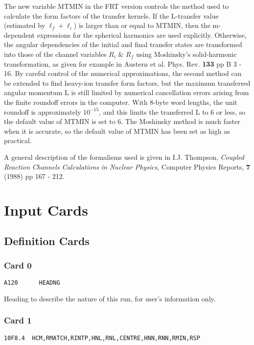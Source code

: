 \documentclass[11pt]{article}
\begin{document}
{The new variable MTMIN in the FRT version controls the method used to
calculate the form factors of the transfer kernels. If the L-transfer value
(estimated by $\ell_f + \ell_i$)
is larger than or equal to MTMIN, then the m-dependent expressions for the
spherical harmonics are used explicitly.
Otherwise, the
angular dependencies of the initial and final transfer states
are transformed into those of the channel variables $R_{i}$ \& $R_{f}$ using
Moshinsky's solid-harmonic transformation, as given for example
in
Austern et al. Phys. Rev. {\bf 133} pp B 3 - 16.
%
By careful control of the numerical approximations, the second method can
be extended to find heavy-ion transfer form factors, but the maximum
transferred angular momentum L is still limited by numerical cancellation
errors arising from the finite roundoff errors in the computer.
With 8-byte word lengths, the unit roundoff is approximately $10^{-15}$,
and this limits the transferred L to 6 or less, so the default value
of MTMIN is set to 6. The Moshinsky method is much faster when it is
accurate, so the default value of MTMIN has been set as high as practical.

A general description of the formalisms used is given in
I.J. Thompson,
{\em Coupled Reaction Channels Calculations in Nuclear Physics},
Computer Physics Reports, {\bf 7} (1988) pp 167 - 212.

}
\newpage
\section{Input Cards}
\subsection{Definition Cards}
%
\subsubsection*{Card 0}
\begin{verbatim}
A120      HEADNG
\end{verbatim}
\smallskip

Heading to describe the nature of this run, for user's information only.
\bigskip

\subsubsection*{Card 1}
\begin{verbatim}
10F8.4  HCM,RMATCH,RINTP,HNL,RNL,CENTRE,HNN,RNN,RMIN,RSP
\end{verbatim}
%
\end{document}

